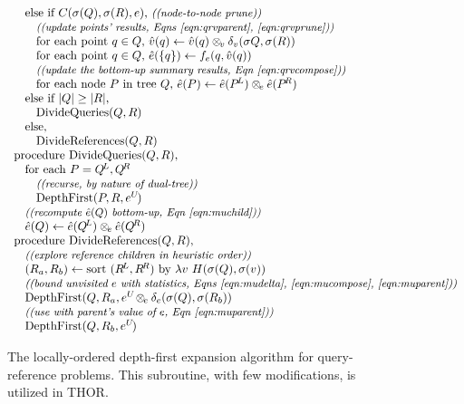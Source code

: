 \documentclass[twoside,leqno,twocolumn]{article}
\newcommand{\com}[1]{{\small \textit{((#1))}}}
\newcommand{\summary}{\delta}
\newcommand{\psty}{}
\newcommand{\X}{\\ \psty}
\newcommand{\x}{\X \hspace{0.13in}}
\newcommand{\xx}{\X \hspace{0.26in}}
\newcommand{\kdroot}[1]{#1^{\text{root}}}
\newcommand{\kdleft}[1]{#1^{\!L}}
\newcommand{\kdright}[1]{#1^{\!R}}
\newcommand{\nameop}[2]{#1_{\!#2}}
\newcommand{\myop}[1]{\nameop{\otimes}{#1}}
\newcommand{\letterqr}{v}
\newcommand{\outqr}{V}
\newcommand{\opqr}{\myop{\letterqr}}
\newcommand{\gqr}{g_{\letterqr}}
\newcommand{\letterqrv}{v}
\newcommand{\deltaqrv}{\summary_{\letterqrv}}
\newcommand{\varqr}{\hat{\letterqr}}
\newcommand{\varqrvparent}{\letterqrv^{P}}
\newcommand{\lettermu}{e}
\newcommand{\outopmu}{\myop{\lettermu}}
\newcommand{\opmu}{\myop{\lettermu}}
\newcommand{\fmu}{f_{\lettermu}}
\newcommand{\fmuv}{f_{\lettermu}}
\newcommand{\deltamu}{\summary_{\lettermu}}
\newcommand{\canprunemu}{C}
\newcommand{\heurqr}{H}
\newcommand{\varmuchild}{\hat{\lettermu}}
\newcommand{\varmuparent}{\lettermu^{U\!}}
\newcommand{\outstat}{\sigma}
\begin{document}
\begin{figure}
{\[\begin{array}[t]{l}
    \x \text{else if } \canprunemu(\outstat(Q), \outstat(R), \lettermu)\text{, \com{node-to-node prune}}
    \xx \text{\com{update points' results, Eqns \ref{eqn:qrvparent}, \ref{eqn:qrvprune}}}
    \xx \text{for each point }q \in Q\text{, }\varqr(q) \gets \varqr(q) \opqr \deltaqrv(\outstat{Q}, \outstat(R))
    \xx \text{for each point }q \in Q\text{, }\varmuchild(\{q\}) \gets \fmu(q, \varqr(q))
    \xx \text{\com{update the bottom-up summary results, Eqn \ref{eqn:qrvcompose}}}
    \xx \text{for each node }P\text{ in tree }Q\text{, }\varmuchild(P) \gets \varmuchild(\kdleft{P}) \outopmu \varmuchild(\kdright{P})
    \x \text{else if } |Q| \geq |R|\text{,}
    \xx \text{DivideQueries}(Q, R)
    \x \text{else,}
    \xx \text{DivideReferences}(Q, R)
    
    \X \text{procedure DivideQueries}(Q, R)\text{,}
    \x \text{for each } P = \kdleft{Q}, \kdright{Q}
    \xx \text{\com{recurse, by nature of dual-tree}}
    \xx \text{DepthFirst}(P, R, \varmuparent)
    \x \text{\com{recompute $\varmuchild(Q)$ bottom-up, Eqn~\ref{eqn:muchild}}}
    \x \varmuchild(Q) \gets \varmuchild(\kdleft{Q}) \outopmu \varmuchild(\kdright{Q})

    \X \text{procedure DivideReferences}(Q, R)\text{,}
    \x \text{\com{explore reference children in heuristic order}}
    \x (R_a, R_b) \gets \text{sort }(\kdleft{R}, \kdright{R})\text{ by }\lambda v ~ \heurqr(\outstat(Q), \outstat(v))
    \x \text{\com{bound unvisited $\lettermu$ with statistics, Eqns \ref{eqn:mudelta}, \ref{eqn:mucompose}, \ref{eqn:muparent}}}
    \x \text{DepthFirst}(Q, R_a, \varmuparent \opmu \deltamu(\outstat(Q), \outstat(R_b))
    \x \text{\com{use with parent's value of $\lettermu$, Eqn \ref{eqn:muparent}}}
    \x \text{DepthFirst}(Q, R_b, \varmuparent)
  \end{array}
\]}
\caption{\label{fig:DepthFirst} The locally-ordered depth-first expansion algorithm for query-reference problems.
This subroutine, with few modifications, is utilized in THOR.
}
\end{figure}
\end{document}
